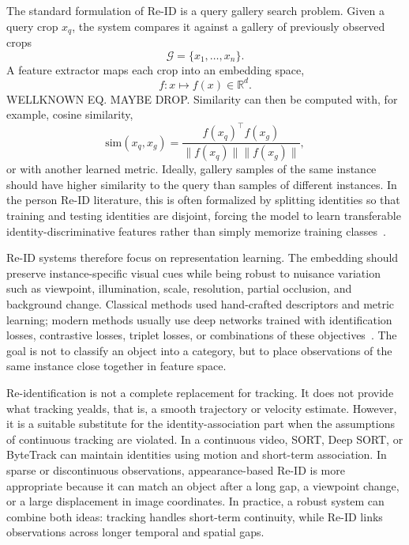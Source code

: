 The standard formulation of Re-ID is a query gallery search problem. Given a query crop \(x_q\), the system compares it against a gallery of previously observed crops
\[
\mathcal{G}=\{x_1,\ldots,x_n\}.
\]
A feature extractor maps each crop into an embedding space,
\[
f:x\mapsto f(x)\in\mathbb{R}^d.
\]
WELLKNOWN EQ. MAYBE DROP. Similarity can then be computed with, for example, cosine similarity,
\[
\mathrm{sim}(x_q,x_g)=
\frac{f(x_q)^\top f(x_g)}
{\|f(x_q)\|\|f(x_g)\|},
\]
or with another learned metric.
Ideally, gallery samples of the same instance should have higher similarity to the query than samples of different instances. In the person Re-ID literature, this is often formalized by splitting identities so that training and testing identities are disjoint, forcing the model to learn transferable identity-discriminative features rather than simply memorize
training classes~\cite{gu_automated_2026}.

Re-ID systems therefore focus on representation learning. The embedding should preserve instance-specific visual cues while being robust to nuisance variation such as viewpoint, illumination, scale, resolution, partial occlusion, and background change. Classical methods used hand-crafted descriptors and metric learning; modern methods usually use deep networks trained with identification losses, contrastive losses, triplet losses, or combinations of these objectives~\cite{zheng_object_2024}. The goal is not to classify an object into a category, but to place observations of the same instance close together in feature space.

Re-identification is not a complete replacement for tracking. It does not provide what tracking yealds, that is, a smooth trajectory or velocity estimate. However, it is a suitable substitute for the identity-association part when the assumptions of continuous tracking are violated. In a continuous video, SORT, Deep SORT, or ByteTrack can maintain identities using motion and short-term association. In sparse or discontinuous observations, appearance-based Re-ID is more appropriate because it can match an object after a long gap, a viewpoint change, or a large displacement in image coordinates. In practice, a robust system can combine both ideas: tracking handles short-term continuity, while Re-ID links observations across longer temporal and spatial gaps.

